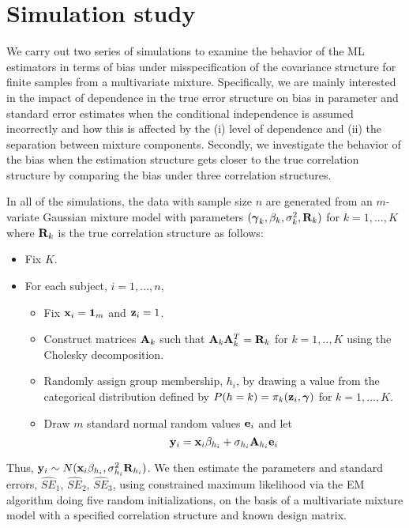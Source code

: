 \section{Simulation study}
We carry out two series of simulations to examine the behavior of the ML estimators in terms of bias under misspecification of the covariance structure for finite samples from a multivariate mixture. Specifically, we are mainly interested in the impact of dependence in the true error structure on bias in parameter and standard error estimates when the conditional independence is assumed incorrectly and how this is affected by the (i) level of dependence and (ii) the separation between mixture components. Secondly, we investigate the behavior of the bias when the estimation structure gets closer to the true correlation structure by comparing the bias under three correlation structures.

In all of the simulations, the data with sample size $n$ are generated from an $m$-variate Gaussian mixture model with parameters $(\boldsymbol\gamma_{k},\beta_{k},\sigma^{2}_{k},\mathbf R_k)$ for $k=1,...,K$ where $\mathbf R_k$ is the true correlation structure as follows:
\begin{itemize}
\item Fix $K$. 
\item For each subject, $i=1,...,n$, 
\begin{itemize}
\item Fix $\mathbf x_{i} = \mathbf 1_{m}$ and $\mathbf z_{i}=1$.
\item Construct matrices $\mathbf A_k$ such that $\mathbf A_k\mathbf A_k^{T}=\mathbf R_k$ for $k=1,..,K$ using the Cholesky decomposition. 
\item Randomly assign group membership, $h_{i}$, by drawing a value from the categorical distribution defined by $P(h=k)=\pi_{k}(\mathbf z_{i},\boldsymbol\gamma)$ for $k=1,...,K$. 
\item Draw $m$ standard normal random values $\mathbf e_{i}$ and let
$$\mathbf y_{i}=\mathbf x_{i}\beta_{h_{i}}+\sigma_{h_{i}}\mathbf A_{h_{i}}\mathbf e_{i}$$
\end{itemize}
\end{itemize}
Thus, $\mathbf y_{i}\sim N(\mathbf x_{i}\beta_{h_{i}},\sigma_{h_{i}}^{2}\mathbf R_{h_{i}})$. We then estimate the parameters and standard errors, $\widehat{SE}_1$, $\widehat{SE}_2$, $\widehat{SE}_3$, using constrained maximum likelihood via the EM algorithm \cite{hathaway1985} doing five random initializations, on the basis of a multivariate mixture model with a specified correlation structure and known design matrix.


